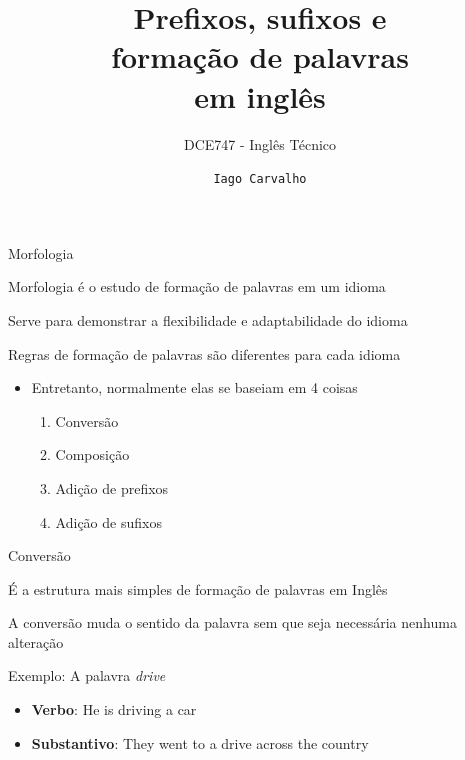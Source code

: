\documentclass[compress,mathserif,xcolor=table]{beamer}
\title{Prefixos, sufixos e \\ formação de palavras \\ em inglês}
\subtitle{DCE747 - Inglês Técnico}
\author{\texttt{Iago Carvalho}}
\institute{\texttt{Departamento de Ciência da Computação}}
\begin{document}
\begin{frame}
\titlepage

\end{frame}


\begin{frame}{Morfologia}

Morfologia é o estudo de formação de palavras em um idioma

\vspace{0.5cm}

Serve para demonstrar a flexibilidade e adaptabilidade do idioma

\vspace{0.5cm}

Regras de formação de palavras são diferentes para cada idioma
\begin{itemize}
    \item Entretanto, normalmente elas se baseiam em 4 coisas
    \begin{enumerate}
        \item Conversão
        \item Composição
        \item Adição de prefixos
        \item Adição de sufixos
    \end{enumerate}
\end{itemize}
\end{frame}


\begin{frame}{Conversão}

É a estrutura mais simples de formação de palavras em Inglês

\vspace{0.5cm}

A conversão muda o sentido da palavra sem que seja necessária nenhuma alteração

\vspace{0.5cm}

Exemplo: A palavra \textit{drive}
\begin{itemize}
    \item \textbf{Verbo}: He is driving a car
    \item \textbf{Substantivo}: They went to a drive across the country
\end{itemize}
\end{frame}
\end{document}
